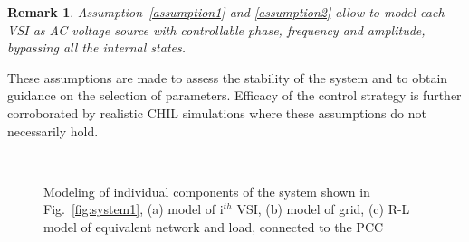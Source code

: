 \documentclass[journal]{IEEEtran}
\newtheorem{remark}{Remark}
\begin{document}
\begin{remark}\label{remark1}
Assumption~\ref{assumption1} and \ref{assumption2} allow to model each VSI as AC voltage source with controllable phase, frequency and amplitude, bypassing all the internal states.
\end{remark}
These assumptions are made to assess the stability of the system and to obtain guidance on the selection of parameters. Efficacy of the control strategy is further corroborated by realistic CHIL simulations where these assumptions do not necessarily hold.
\begin{figure}[t]
	\centering
	~
	~
	\caption{Modeling of individual components of the system shown in Fig.~\ref{fig:system1}, (a) model of $\mathrm{i}^{th}$ VSI, (b) model of grid, (c) R-L model of equivalent network and load, connected to the PCC}
	\label{fig:comp}
\end{figure}
\end{document}
